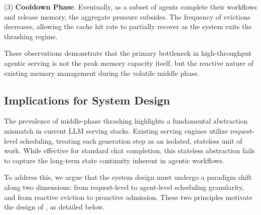 (3) \noindent\textbf{Cooldown Phase}. 
Eventually, as a subset of agents complete their workflows and release memory, the aggregate pressure subsides. The frequency of evictions decreases, allowing the cache hit rate to partially recover as the system exits the thrashing regime.


These observations demonstrate that the primary bottleneck in high-throughput agentic serving is not the peak memory capacity itself, but the reactive nature of existing memory management during the volatile middle phase.

\subsection{Implications for System Design}

The prevalence of middle-phase thrashing highlights a fundamental abstraction mismatch in current LLM serving stacks. 
Existing serving engines utilize request-level scheduling, treating each generation step as an isolated, stateless unit of work. 
While effective for standard chat completion, this stateless abstraction fails to capture the long-term state continuity inherent in agentic workflows. 

To address this, we argue that the system design must undergo a paradigm shift along two dimensions: from request-level to agent-level scheduling granularity, and from reactive eviction to proactive admission. 
These two principles motivate the design of \SysName, as detailed below. 


